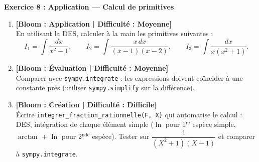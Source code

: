\documentclass[12pt,a4paper]{report}
\theoremstyle{definition}
\theoremstyle{remark}
\begin{document}
\noindent\textbf{Exercice 8 : Application --- Calcul de primitives}
\begin{enumerate}
    \item \textbf{[Bloom : Application | Difficulté : Moyenne]} \\
    En utilisant la DES, calculer à la main les primitives suivantes :
    \[ I_1 = \int \frac{dx}{x^2 - 1}, \qquad I_2 = \int \frac{x\, dx}{(x - 1)(x - 2)}, \qquad I_3 = \int \frac{dx}{x(x^2 + 1)}. \]
    \item \textbf{[Bloom : Évaluation | Difficulté : Moyenne]} \\
    Comparer avec \texttt{sympy.integrate} : les expressions doivent coïncider à une constante près (utiliser \texttt{sympy.simplify} sur la différence).
    \item \textbf{[Bloom : Création | Difficulté : Difficile]} \\
    Écrire \texttt{integrer\_fraction\_rationnelle(F, X)} qui automatise le calcul : DES, intégration de chaque élément simple ($\ln$ pour 1$^{\text{re}}$ espèce simple, $\arctan$ + $\ln$ pour 2$^{\text{nde}}$ espèce). Tester sur $\dfrac{1}{(X^2 + 1)(X - 1)}$ et comparer à \texttt{sympy.integrate}.
\end{enumerate}
\end{document}
